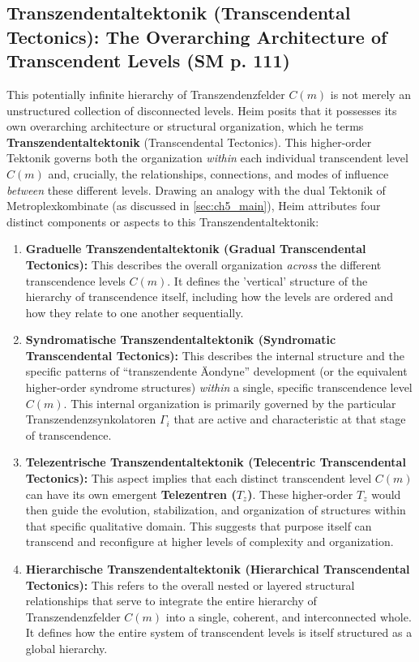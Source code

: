 \documentclass[
    12pt,              %
    a4paper,           %
    headings=normal,   %
    twoside=true,      %
    BCOR=8mm,          %
]{scrbook}
\newcommand{\q}[1]{\enquote{#1}}
\newcommand{\telezentrum}{T_z}
\newcommand{\transzendenzstufe}[1]{C(#1)}
\newcommand{\transzendenzsynkolator}{\Gamma_i}
\begin{document}
\subsection{Transzendentaltektonik (Transcendental Tectonics): The Overarching Architecture of Transcendent Levels (SM p. 111)}
\label{sec:ch6_transzendentaltektonik}
This potentially infinite hierarchy of Transzendenzfelder \(\transzendenzstufe{m}\) is not merely an unstructured collection of disconnected levels. Heim posits that it possesses its own overarching architecture or structural organization, which he terms \textbf{Transzendentaltektonik} (Transcendental Tectonics). This higher-order Tektonik governs both the organization \textit{within} each individual transcendent level \(\transzendenzstufe{m}\) and, crucially, the relationships, connections, and modes of influence \textit{between} these different levels. Drawing an analogy with the dual Tektonik of Metroplexkombinate (as discussed in \ref{sec:ch5_main}), Heim attributes four distinct components or aspects to this Transzendentaltektonik:
\begin{enumerate}
    \item  \textbf{Graduelle Transzendentaltektonik (Gradual Transcendental Tectonics):} This describes the overall organization \textit{across} the different transcendence levels \(\transzendenzstufe{m}\). It defines the 'vertical' structure of the hierarchy of transcendence itself, including how the levels are ordered and how they relate to one another sequentially.
    \item  \textbf{Syndromatische Transzendentaltektonik (Syndromatic Transcendental Tectonics):} This describes the internal structure and the specific patterns of \q{transzendente Äondyne} development (or the equivalent higher-order syndrome structures) \textit{within} a single, specific transcendence level \(\transzendenzstufe{m}\). This internal organization is primarily governed by the particular Transzendenzsynkolatoren \(\transzendenzsynkolator\) that are active and characteristic at that stage of transcendence.
    \item  \textbf{Telezentrische Transzendentaltektonik (Telecentric Transcendental Tectonics):} This aspect implies that each distinct transcendent level \(\transzendenzstufe{m}\) can have its own emergent \textbf{Telezentren (\(\telezentrum\))}. These higher-order \(\telezentrum\) would then guide the evolution, stabilization, and organization of structures within that specific qualitative domain. This suggests that purpose itself can transcend and reconfigure at higher levels of complexity and organization.
    \item  \textbf{Hierarchische Transzendentaltektonik (Hierarchical Transcendental Tectonics):} This refers to the overall nested or layered structural relationships that serve to integrate the entire hierarchy of Transzendenzfelder \(\transzendenzstufe{m}\) into a single, coherent, and interconnected whole. It defines how the entire system of transcendent levels is itself structured as a global hierarchy.
\end{enumerate}
\end{document}
